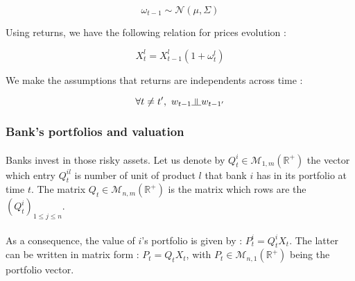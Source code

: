 \documentclass{article}
\newcommand{\indep}{\rotatebox[origin=c]{90}{$\models$}}
\begin{document}
    $$\omega_{t-1} \sim \mathcal{N}(\mu, \Sigma)$$

Using returns, we have the following relation for prices evolution :
    
    $$ X_t^l = X_{t-1}^l (1 + \omega^l_t) $$
    
We make the assumptions that returns are independents across time :
    
    $$ \forall t \neq t',~ w_{t-1} \indep w_{t-1'} $$
    

    

\subsubsection{Bank's portfolios and valuation}\label{ptfsubsub}

\paragraph{}
Banks invest in those risky assets. Let us denote by $Q_t^i \in \mathcal{M}_{1, m}(\mathbb{R}^+)$ the vector which entry $Q_t^{il}$ is number of unit of product $l$ that bank $i$ has in its portfolio at time $t$. The matrix $Q_t \in \mathcal{M}_{n,m}(\mathbb{R}^+)$ is the matrix which rows are the $(Q_t^i)_{1 \leq j \leq n}$.
    
\paragraph{}
As a consequence, the value of $i$'s portfolio is given by : $P_t^{i} = Q_t^i X_t$. The latter can be written in matrix form : $P_t = Q_t X_t $, with $P_t \in \mathcal{M}_{n, 1}(\mathbb{R}^+)$ being the portfolio vector.
    

\end{document}
